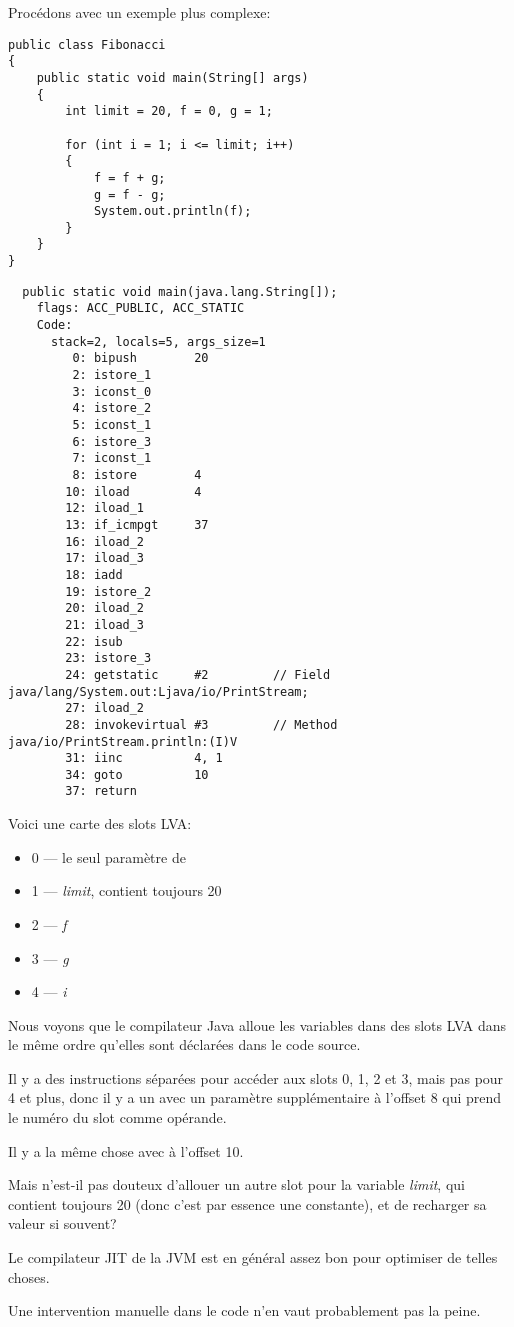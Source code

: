 Procédons avec un exemple plus complexe:


\begin{lstlisting}[style=customjava]
public class Fibonacci
{
	public static void main(String[] args)
	{
		int limit = 20, f = 0, g = 1;

		for (int i = 1; i <= limit; i++)
		{
			f = f + g;
			g = f - g;
			System.out.println(f);
		}
	}
}
\end{lstlisting}

\begin{lstlisting}
  public static void main(java.lang.String[]);
    flags: ACC_PUBLIC, ACC_STATIC
    Code:
      stack=2, locals=5, args_size=1
         0: bipush        20
         2: istore_1
         3: iconst_0
         4: istore_2
         5: iconst_1
         6: istore_3
         7: iconst_1
         8: istore        4
        10: iload         4
        12: iload_1
        13: if_icmpgt     37
        16: iload_2
        17: iload_3
        18: iadd
        19: istore_2
        20: iload_2
        21: iload_3
        22: isub
        23: istore_3
        24: getstatic     #2         // Field java/lang/System.out:Ljava/io/PrintStream;
        27: iload_2
        28: invokevirtual #3         // Method java/io/PrintStream.println:(I)V
        31: iinc          4, 1
        34: goto          10
        37: return
\end{lstlisting}

Voici une carte des slots \ac{LVA}:


\begin{itemize}
\item 0 --- le seul paramètre de \main
\item 1 --- \emph{limit}, contient toujours 20
\item 2 --- \emph{f}
\item 3 --- \emph{g}
\item 4 --- \emph{i}
\end{itemize}

Nous voyons que le compilateur Java alloue les variables dans des slots \ac{LVA}
dans le même ordre qu'elles sont déclarées dans le code source.


Il y a des instructions  séparées pour accéder aux slots 0, 1, 2 et 3,
mais pas pour 4 et plus, donc il y a un  avec un paramètre supplémentaire
à l'offset 8 qui prend le numéro du slot comme opérande.

Il y a la même chose avec  à l'offset 10.


Mais n'est-il pas douteux d'allouer un autre slot pour la variable \emph{limit},
qui contient toujours 20 (donc c'est par essence une constante), et de recharger
sa valeur si souvent?

Le compilateur \ac{JIT} de la \ac{JVM} est en général assez bon pour optimiser de
telles choses.

Une intervention manuelle dans le code n'en vaut probablement pas la peine.


